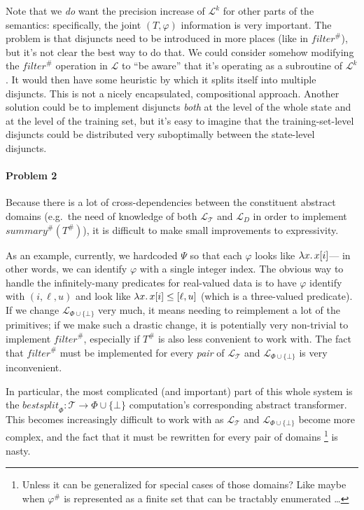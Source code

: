 Note that we \emph{do} want the precision increase of $\mathcal{L}^k$
for other parts of the semantics:
specifically, the joint $(T, \varphi)$ information is very important.
The problem is that disjuncts need to be introduced in more places
(like in $\mathit{filter}^\#$), but it's not clear the best way to do that.
We could consider somehow modifying the $\mathit{filter}^\#$ operation in $\mathcal{L}$
to ``be aware'' that it's operating as a subroutine of $\mathcal{L}^k$.
It would then have some heuristic by which it splits itself into multiple disjuncts.
This is not a nicely encapsulated, compositional approach.
Another solution could be to implement disjuncts \emph{both}
at the level of the whole state and at the level of the training set,
but it's easy to imagine that the training-set-level disjuncts could be distributed
very suboptimally between the state-level disjuncts.

\paragraph{Problem 2}
Because there is a lot of cross-dependencies between the constituent abstract domains
(e.g.\ the need of knowledge of both $\mathcal{L}_\mathcal{T}$ and $\mathcal{L}_D$
in order to implement $\mathit{summary}^\#(T^\#)$),
it is difficult to make small improvements to expressivity.

As an example,
currently, we hardcoded $\Psi$ so that each $\varphi$ looks like $\lambda x \ldotp x[i]$---%
in other words, we can identify $\varphi$ with a single integer index.
The obvious way to handle the infinitely-many predicates for real-valued data
is to have $\varphi$ identify with $(i, \ell, u)$ and look like
$\lambda x \ldotp x[i] \leq [\ell, u]$ (which is a three-valued predicate).
If we change $\mathcal{L}_{\Phi\cup\{\bot\}}$ very much,
it means needing to reimplement a lot of the primitives;
if we make such a drastic change,
it is potentially very non-trivial to implement $\mathit{filter}^\#$,
especially if $T^\#$ is also less convenient to work with.
The fact that $\mathit{filter}^\#$ must be implemented for every \emph{pair}
of $\mathcal{L}_\mathcal{T}$ and $\mathcal{L}_{\Phi\cup\{\bot\}}$
is very inconvenient.

In particular, the most complicated (and important) part of this whole system
is the $\mathit{bestsplit}_\Phi : \mathcal{T} \rightarrow \Phi \cup \{\bot\}$ computation's
corresponding abstract transformer.
This becomes increasingly difficult to work with as $\mathcal{L}_\mathcal{T}$
and $\mathcal{L}_{\Phi\cup\{\bot\}}$ become more complex,
and the fact that it must be rewritten for every pair of domains%
\footnote{Unless it can be generalized for special cases of those domains?
Like maybe when $\varphi^\#$ is represented as a finite set
that can be tractably enumerated \ldots}
is nasty.
